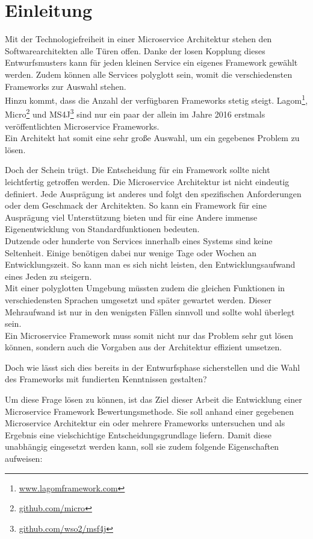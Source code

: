 \section{Einleitung}

Mit der Technologiefreiheit in einer Microservice Architektur stehen den Softwarearchitekten alle Türen offen. Danke der losen Kopplung dieses Entwurfsmusters kann für jeden kleinen Service ein eigenes Framework gewählt werden. Zudem können alle Services polyglott sein, womit die verschiedensten Frameworks zur Auswahl stehen.\\
Hinzu kommt, dass die Anzahl der verfügbaren Frameworks stetig steigt. Lagom\footnote{\url{www.lagomframework.com}},  Micro\footnote{\url{github.com/micro}} und MS4J\footnote{\url{github.com/wso2/msf4j}} sind nur ein paar der allein im Jahre 2016 erstmals veröffentlichten Microservice Frameworks.\\
Ein Architekt hat somit eine sehr große Auswahl, um ein gegebenes Problem zu lösen.

Doch der Schein trügt. Die Entscheidung für ein Framework sollte nicht leichtfertig getroffen werden. Die Microservice Architektur ist nicht eindeutig definiert\cite[11]{Wolff2015}. Jede Ausprägung ist anderes und folgt den spezifischen Anforderungen oder dem Geschmack der Architekten. So kann ein Framework für eine Ausprägung viel Unterstützung bieten und für eine Andere immense Eigenentwicklung von Standardfunktionen bedeuten.\\
Dutzende oder hunderte von Services innerhalb eines Systems sind keine Seltenheit. Einige benötigen dabei nur wenige Tage oder Wochen an Entwicklungszeit. So kann man es sich nicht leisten, den Entwicklungsaufwand eines Jeden zu steigern\cite{Richardson2016}.\\ 
Mit einer polyglotten Umgebung müssten zudem die gleichen Funktionen in verschiedensten Sprachen umgesetzt und später gewartet werden. Dieser Mehraufwand ist nur in den wenigsten Fällen sinnvoll und sollte wohl überlegt sein.\\
Ein Microservice Framework muss somit nicht nur das Problem sehr gut lösen können, sondern auch die Vorgaben aus der Architektur effizient umsetzen.  

Doch wie lässt sich dies bereits in der Entwurfsphase sicherstellen und die Wahl des Frameworks mit fundierten Kenntnissen gestalten?

Um diese Frage lösen zu können, ist das Ziel dieser Arbeit die Entwicklung einer Microservice Framework Bewertungsmethode. Sie soll anhand einer gegebenen Microservice Architektur ein oder mehrere Frameworks untersuchen und als Ergebnis eine vielschichtige Entscheidungsgrundlage liefern.
Damit diese unabhängig eingesetzt werden kann, soll sie zudem folgende Eigenschaften aufweisen:

